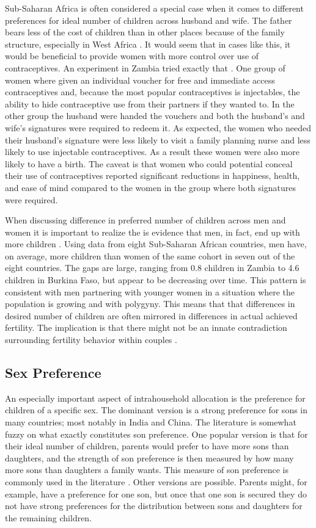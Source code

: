 \documentclass[letterpaper,12pt]{article}
\begin{document}
Sub-Saharan Africa is often considered a special case when
it comes to different preferences for ideal number of
children across husband and wife.
The father bears less of the cost of children than
in other places because of the family structure,
especially in West Africa \citep{Caldwell1992}.
It would seem that in cases like this, it would be 
beneficial to provide women with more control over
use of contraceptives. 
An experiment in Zambia tried exactly that \citep{Ashraf2014}.
One  group of women where given an individual voucher for
free and immediate access contraceptives and, because the most popular 
contraceptives is injectables, the ability to hide contraceptive use from
their partners if they wanted to.
In the other group the husband were handed the vouchers and both the
husband's and wife's signatures were required to redeem it.
As expected, the women who needed their husband's signature were
less likely to visit a family planning nurse and less likely to
use injectable contraceptives. 
As a result these women were also more likely to have a birth.
The caveat is that women who could potential conceal their use
of contraceptives reported significant reductions in happiness, 
health, and ease of mind compared to the women in the group
where both signatures were required. 

When discussing difference in preferred number of children across men
and women it is important to realize the is evidence that men, in fact, 
end up with more children \citep{Field2016}.
Using data from eight Sub-Saharan African countries, men have, on
average, more children than women of the same cohort in seven out of the eight
countries.
The gaps are large, ranging from 0.8 children in Zambia to 4.6 children 
in Burkina Faso, but appear to be decreasing over time.
This pattern is consistent with men partnering with younger women in
a situation where the population is growing and with polygyny.
This means that that differences in desired number of children are
often mirrored in differences in actual achieved fertility.
The implication is that there might not be an innate contradiction 
surrounding fertility behavior within couples \citep{Field2016}.

\subsection{Sex Preference}

An especially important aspect of intrahousehold allocation is
the preference for children of a specific sex.
The dominant version is a strong preference for sons
in many countries; most notably in India and China.
The literature is somewhat fuzzy on what exactly 
constitutes son preference.
One popular version is that for their ideal number of children, parents 
would prefer to have more sons than daughters, and the strength of son
preference is then measured by how many more sons than daughters a family wants.
This measure of son preference is commonly used in the literature 
\citep[See, for example,]{clark00,Jensen2009,Hu2015}.
Other versions are possible.
Parents might, for example, have a preference for one son, but
once that one son is secured they do not have strong preferences for
the distribution between sons and daughters for the remaining children.
\end{document}
